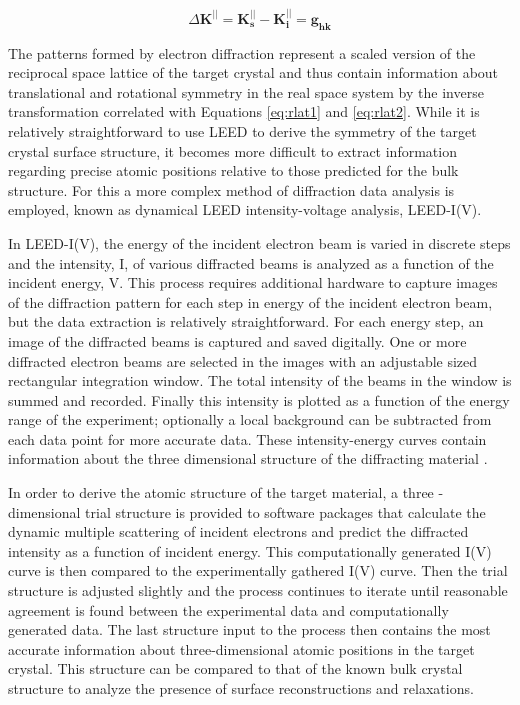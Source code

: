\begin{equation}
\label{eq:laue}
\Delta \mathbf{K^{||}} = \mathbf{K_{s}^{||} - K_{i}^{||}} = \mathbf{g_{hk}}
\end{equation}

The patterns formed by electron diffraction represent a scaled version of the reciprocal space lattice of the target crystal and thus contain information about translational and rotational symmetry in the real space system by the inverse transformation correlated with Equations \ref{eq:rlat1} and \ref{eq:rlat2}. While it is relatively straightforward to use LEED to derive the symmetry of the target crystal surface structure, it becomes more difficult to extract information regarding precise atomic positions relative to those predicted for the bulk structure. For this a more complex method of diffraction data analysis is employed, known as dynamical LEED intensity-voltage analysis, LEED-I(V).

In LEED-I(V), the energy of the incident electron beam is varied in discrete steps and the intensity, I, of various diffracted beams is analyzed as a function of the incident energy, V. This process requires additional hardware to capture images of the diffraction pattern for each step in energy of the incident electron beam, but the data extraction is relatively straightforward. For each energy step, an image of the diffracted beams is captured and saved digitally. One or more diffracted electron beams are selected in the images with an adjustable sized rectangular integration window. The total intensity of the beams in the window is summed and recorded. Finally this intensity is plotted as a function of the energy range of the experiment; optionally a local background can be subtracted from each data point for more accurate data. These intensity-energy curves contain information about the three dimensional structure of the diffracting material \cite{Hannon-LEEM-Book, vanHove-LEED, pendry-LEED}. 

In order to derive the atomic structure of the target material, a three -dimensional trial structure is provided to software packages that calculate the dynamic multiple scattering of incident electrons and predict the diffracted intensity as a function of incident energy. This computationally generated I(V) curve is then compared to the experimentally gathered I(V) curve. Then the trial structure is adjusted slightly and the process continues to iterate until reasonable agreement is found between the experimental data and computationally generated data. The last structure input to the process then contains the most accurate information about three-dimensional atomic positions in the target crystal. This structure can be compared to that of the known bulk crystal structure to analyze the presence of surface reconstructions and relaxations.


